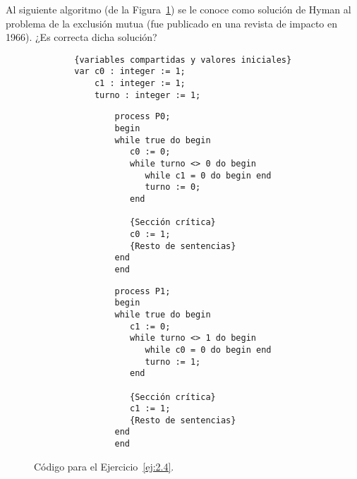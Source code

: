 \begin{ejercicio}\label{ej:2.4}
    Al siguiente algoritmo (de la Figura~\ref{fig:cod_4}) se le conoce como solución de Hyman al problema de la exclusión mutua (fue publicado en una revista de impacto en 1966). ¿Es correcta dicha solución?
    \begin{figure}[H]
        \centering
        \begin{verbatim}
        {variables compartidas y valores iniciales}
        var c0 : integer := 1;
            c1 : integer := 1;
            turno : integer := 1;
        \end{verbatim}
        \setlength{\columnsep}{1cm}
        \begin{multicols}{2}
            \begin{verbatim}
                process P0;
                begin
                while true do begin
                   c0 := 0;
                   while turno <> 0 do begin
                      while c1 = 0 do begin end
                      turno := 0;
                   end

                   {Sección crítica}
                   c0 := 1;
                   {Resto de sentencias}
                end
                end
            \end{verbatim}
            \begin{verbatim}
                process P1;
                begin
                while true do begin
                   c1 := 0;
                   while turno <> 1 do begin
                      while c0 = 0 do begin end
                      turno := 1;
                   end

                   {Sección crítica}
                   c1 := 1;
                   {Resto de sentencias}
                end
                end
            \end{verbatim}
        \end{multicols}
        \caption{Código para el Ejercicio~\ref{ej:2.4}.}
        \label{fig:cod_4}
    \end{figure}
    \ \\


\end{ejercicio}
